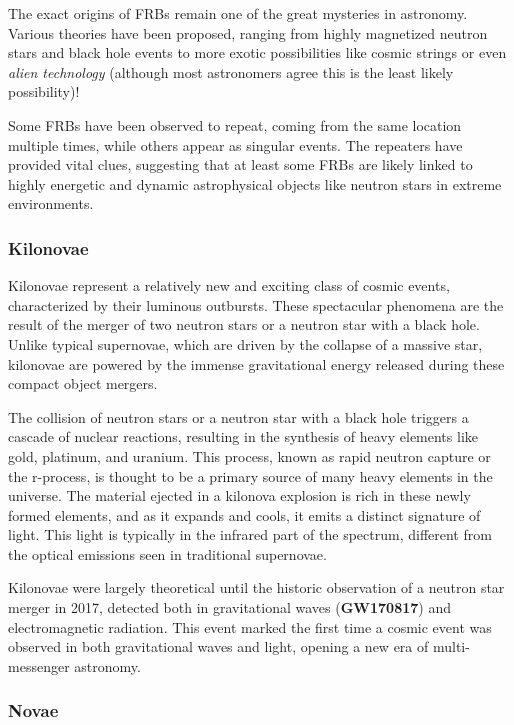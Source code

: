 The exact origins of FRBs remain one of the great mysteries in astronomy. Various theories have been proposed, ranging from highly magnetized neutron stars and black hole events to more exotic possibilities like cosmic strings or even \textit{alien technology} (although most astronomers agree this is the least likely possibility)!

Some FRBs have been observed to repeat, coming from the same location multiple times, while others appear as singular events. The repeaters have provided vital clues, suggesting that at least some FRBs are likely linked to highly energetic and dynamic astrophysical objects like neutron stars in extreme environments.

\subsubsection{Kilonovae}
Kilonovae represent a relatively new and exciting class of cosmic events, characterized by their luminous outbursts. These spectacular phenomena are the result of the merger of two neutron stars or a neutron star with a black hole. Unlike typical supernovae, which are driven by the collapse of a massive star, kilonovae are powered by the immense gravitational energy released during these compact object mergers.

The collision of neutron stars or a neutron star with a black hole triggers a cascade of nuclear reactions, resulting in the synthesis of heavy elements like gold, platinum, and uranium. This process, known as rapid neutron capture or the r-process, is thought to be a primary source of many heavy elements in the universe. The material ejected in a kilonova explosion is rich in these newly formed elements, and as it expands and cools, it emits a distinct signature of light. This light is typically in the infrared part of the spectrum, different from the optical emissions seen in traditional supernovae.

Kilonovae were largely theoretical until the historic observation of a neutron star merger in 2017, detected both in gravitational waves (\textbf{GW170817}) and electromagnetic radiation. This event marked the first time a cosmic event was observed in both gravitational waves and light, opening a new era of multi-messenger astronomy.

\subsubsection{Novae}

